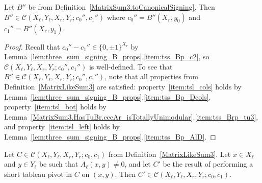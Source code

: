 \begin{lemma}
    \label{lem:three_sum_like_signing_B}
    \leanok
    Let $B''$ be from Definition~\ref{MatrixSum3.toCanonicalSigning}. Then $B'' \in \mathcal{C} (X_{\ell}, Y_{\ell}, X_{r}, Y_{r}; c_{0}'', c_{1}'')$ where $c_{0}'' = B'' (X_{r}, y_{0})$ and $c_{1}'' = B'' (X_{r}, y_{1})$.
\end{lemma}

\begin{proof}
    Recall that $c_{0}'' - c_{1}'' \in \{0, \pm 1\}^{X_{r}}$ by Lemma~\ref{lem:three_sum_signing_B_props}.\ref{item:tss_Bp_c2}, so $\mathcal{C} (X_{\ell}, Y_{\ell}, X_{r}, Y_{r}; c_{0}'', c_{1}'')$ is well-defined. To see that $B'' \in \mathcal{C} (X_{\ell}, Y_{\ell}, X_{r}, Y_{r}; c_{0}'', c_{1}'')$, note that all properties from Definition~\ref{MatrixLikeSum3} are satisfied: property~\ref{item:tsl_cols} holds by Lemma~\ref{lem:three_sum_signing_B_props}.\ref{item:tss_Bp_Dcols}, property~\ref{item:tsl_bot} holds by Lemma~\ref{MatrixSum3.HasTuBr.cccAr_isTotallyUnimodular}.\ref{item:tss_Brp_tu3}, and property~\ref{item:tsl_left} holds by Lemma~\ref{lem:three_sum_signing_B_props}.\ref{item:tss_Bp_AlD}.
\end{proof}

\begin{lemma}
    \label{lem:three_sum_like_pivot}
    \leanok
    Let $C \in \mathcal{C} (X_{\ell}, Y_{\ell}, X_{r}, Y_{r}; c_{0}, c_{1})$ from Definition~\ref{MatrixLikeSum3}. Let $x \in X_{\ell}$ and $y \in Y_{\ell}$ be such that $A_{\ell} (x, y) \neq 0$, and let $C'$ be the result of performing a short tableau pivot in $C$ on $(x, y)$. Then $C' \in \mathcal{C} (X_{\ell}, Y_{\ell}, X_{r}, Y_{r}; c_{0}, c_{1})$.
\end{lemma}

